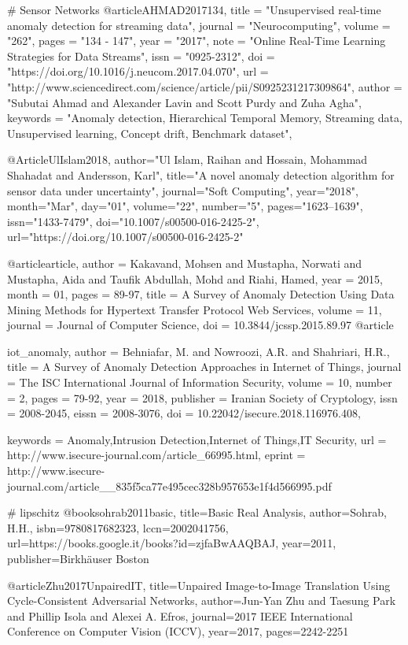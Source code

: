 # Sensor Networks
@article{AHMAD2017134,
title = "Unsupervised real-time anomaly detection for streaming data",
journal = "Neurocomputing",
volume = "262",
pages = "134 - 147",
year = "2017",
note = "Online Real-Time Learning Strategies for Data Streams",
issn = "0925-2312",
doi = "https://doi.org/10.1016/j.neucom.2017.04.070",
url = "http://www.sciencedirect.com/science/article/pii/S0925231217309864",
author = "Subutai Ahmad and Alexander Lavin and Scott Purdy and Zuha Agha",
keywords = "Anomaly detection, Hierarchical Temporal Memory, Streaming data, Unsupervised learning, Concept drift, Benchmark dataset",
}

@Article{UlIslam2018,
author="Ul Islam, Raihan
and Hossain, Mohammad Shahadat
and Andersson, Karl",
title="A novel anomaly detection algorithm for sensor data under uncertainty",
journal="Soft Computing",
year="2018",
month="Mar",
day="01",
volume="22",
number="5",
pages="1623--1639",
issn="1433-7479",
doi="10.1007/s00500-016-2425-2",
url="https://doi.org/10.1007/s00500-016-2425-2"
}

@article{article,
author = {Kakavand, Mohsen and Mustapha, Norwati and Mustapha, Aida and Taufik Abdullah, Mohd and Riahi, Hamed},
year = {2015},
month = {01},
pages = {89-97},
title = {A Survey of Anomaly Detection Using Data Mining Methods for Hypertext Transfer Protocol Web Services},
volume = {11},
journal = {Journal of Computer Science},
doi = {10.3844/jcssp.2015.89.97}
}
@article {iot_anomaly,
author = {Behniafar, M. and Nowroozi, A.R. and Shahriari, H.R.},
title = {A Survey of Anomaly Detection Approaches in Internet of Things},
journal = {The ISC International Journal of Information Security},
volume = {10},
number = {2},
pages = {79-92},
year  = {2018},
publisher = {Iranian Society of Cryptology},
issn = {2008-2045},
eissn = {2008-3076},
doi = {10.22042/isecure.2018.116976.408},

keywords = {Anomaly,Intrusion Detection,Internet of Things,IT Security},
url = {http://www.isecure-journal.com/article_66995.html},
eprint = {http://www.isecure-journal.com/article__835f5ca77e495cec328b957653e1f4d566995.pdf}
}

# lipschitz
@book{sohrab2011basic,
  title={Basic Real Analysis},
  author={Sohrab, H.H.},
  isbn={9780817682323},
  lccn={2002041756},
  url={https://books.google.it/books?id=zjfaBwAAQBAJ},
  year={2011},
  publisher={Birkh{\"a}user Boston}
}

  @article{Zhu2017UnpairedIT,
  title={Unpaired Image-to-Image Translation Using Cycle-Consistent Adversarial Networks},
  author={Jun-Yan Zhu and Taesung Park and Phillip Isola and Alexei A. Efros},
  journal={2017 IEEE International Conference on Computer Vision (ICCV)},
  year={2017},
  pages={2242-2251}
}

